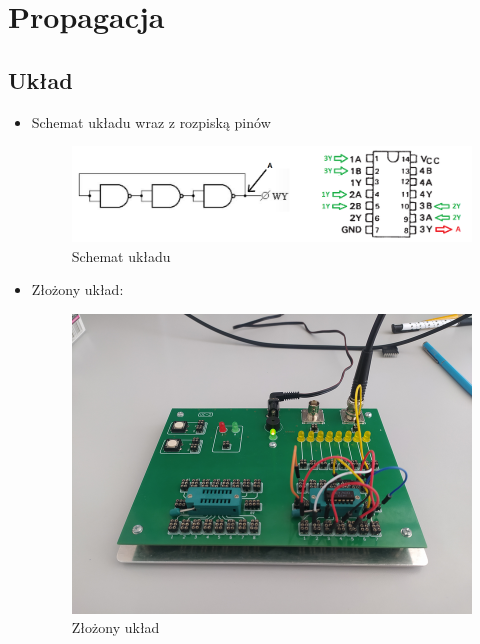 \chapter{Propagacja}

\section{Układ}

\begin{itemize}
    \item Schemat układu wraz z rozpiską pinów
        \begin{figure}[H]
            \centering
            \includegraphics[width=\textwidth]{img/schemes_with_pins/propagacja_w_pins.png}
            \caption{Schemat układu}
            \label{propagacja:schemat}
        \end{figure}
        
    \item Złożony układ:
        \begin{figure}[H]
            \centering
            \includegraphics[width=\textwidth]{img/propagacja/1652306732374_scaled.png}
            \caption{Złożony układ}
            \label{propagacja:zlozony_uklad}
        \end{figure}
\end{itemize}

